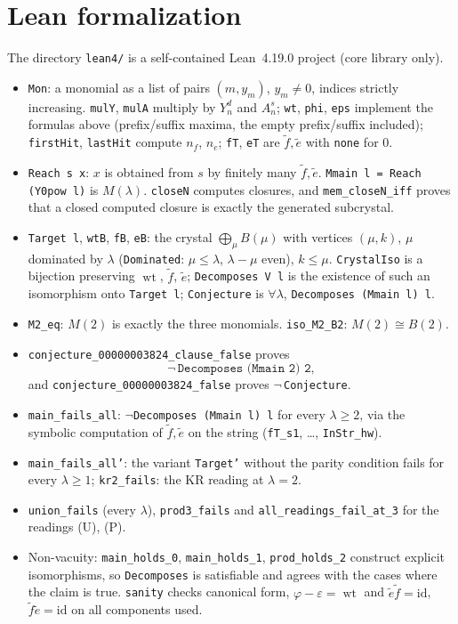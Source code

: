 \documentclass[11pt]{article}
\theoremstyle{definition}
\theoremstyle{remark}
\newcommand{\et}{\tilde e}
\newcommand{\ft}{\tilde f}
\newcommand{\wt}{\operatorname{wt}}
\begin{document}
\section{Lean formalization}
The directory \texttt{lean4/} is a self-contained Lean~4.19.0 project (core
library only).
\begin{itemize}
\item \texttt{Mon}: a monomial as a list of pairs $(m,y_m)$, $y_m\ne0$, indices
strictly increasing. \texttt{mulY}, \texttt{mulA} multiply by $Y_n^d$ and
$A_n^{s}$; \texttt{wt}, \texttt{phi}, \texttt{eps} implement the formulas
above (prefix/suffix maxima, the empty prefix/suffix included);
\texttt{firstHit}, \texttt{lastHit} compute $n_f$, $n_e$; \texttt{fT}, \texttt{eT}
are $\ft,\et$ with \texttt{none} for $0$.
\item \texttt{Reach s x}: $x$ is obtained from $s$ by finitely many $\ft,\et$.
\texttt{Mmain l = Reach (Y0pow l)} is $M(\lambda)$. \texttt{closeN} computes
closures, and \texttt{mem\_closeN\_iff} proves that a closed computed closure is
exactly the generated subcrystal.
\item \texttt{Target l}, \texttt{wtB}, \texttt{fB}, \texttt{eB}: the crystal
$\bigoplus_{\mu}B(\mu)$ with vertices $(\mu,k)$, $\mu$ dominated by $\lambda$
(\texttt{Dominated}: $\mu\le\lambda$, $\lambda-\mu$ even), $k\le\mu$.
\texttt{CrystalIso} is a bijection preserving $\wt$, $\ft$, $\et$;
\texttt{Decomposes V l} is the existence of such an isomorphism onto
\texttt{Target l}; \texttt{Conjecture} is $\forall\lambda$,
\texttt{Decomposes (Mmain l) l}.
\item \texttt{M2\_eq}: $M(2)$ is exactly the three monomials.
\texttt{iso\_M2\_B2}: $M(2)\cong B(2)$.
\item \texttt{conjecture\_00000003824\_clause\_false} proves
\[\neg\,\texttt{Decomposes (Mmain 2) 2},\]
and \texttt{conjecture\_00000003824\_false} proves $\neg$\,\texttt{Conjecture}.
\item \texttt{main\_fails\_all}: $\neg$\texttt{Decomposes (Mmain l) l} for every
$\lambda\ge2$, via the symbolic computation of $\ft,\et$ on the string
(\texttt{fT\_s1}, \dots, \texttt{InStr\_hw}).
\item \texttt{main\_fails\_all'}: the variant \texttt{Target'} without the parity
condition fails for every $\lambda\ge1$; \texttt{kr2\_fails}: the KR reading at
$\lambda=2$.
\item \texttt{union\_fails} (every $\lambda$), \texttt{prod3\_fails} and
\texttt{all\_readings\_fail\_at\_3} for the readings (U), (P).
\item Non-vacuity: \texttt{main\_holds\_0}, \texttt{main\_holds\_1},
\texttt{prod\_holds\_2} construct explicit isomorphisms, so
\texttt{Decomposes} is satisfiable and agrees with the cases where the claim is true.
\texttt{sanity} checks canonical form, $\varphi-\varepsilon=\wt$ and
$\et\ft=\mathrm{id}$, $\ft\et=\mathrm{id}$ on all components used.
\end{itemize}
\end{document}
